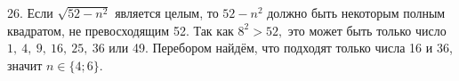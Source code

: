 26. Если $\sqrt{52-n^2}$ является целым, то $52-n^2$ должно быть некоторым полным квадратом, не превосходящим 52. Так как $8^2>52,$ это может быть только число $1,\ 4,\ 9,\ 16,\ 25,\ 36$ или 49. Перебором найдём, что подходят только числа 16 и 36, значит $n\in\{4;6\}.$\\

